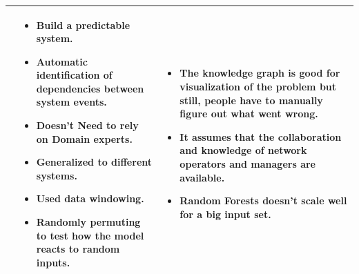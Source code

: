 \begin{longtable}{| p{25mm} | p{62mm} | p{62mm} |}
    \cite{gonzalez2017root} &
    \vspace{-8mm}
    \begin{itemize}[leftmargin=3mm,noitemsep,nolistsep] 
        \item Build a predictable system.
        \item Automatic identification of dependencies between system events.
        \item Doesn't Need to rely on Domain experts.
        \item Generalized to different systems.
        \item Used data windowing.
        \item Randomly permuting to test how the model reacts to random inputs.
        \vspace{-7mm}
    \end{itemize} &
    \vspace{-8mm}
    \begin{itemize}[leftmargin=3mm,noitemsep,nolistsep] 
        \item The knowledge graph is good for visualization of the problem but still, people have to manually figure out what went wrong.
        \item It assumes that the collaboration and knowledge of network operators and managers are available.
        \item Random Forests doesn't scale well for a big input set.
        \vspace{-7mm}
    \end{itemize} \\ \hline
    

\end{longtable}
